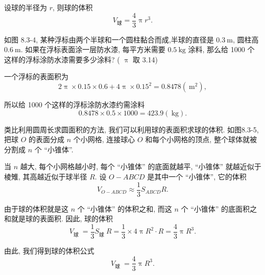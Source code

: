 \begin{formula}[球的体积]
	设球的半径为 $r$, 则球的体积
  $$
  V_{\text{球}}=\frac{4}{3} \uppi r^{3}.
  $$
\end{formula}

\begin{example}
	如图 8.3-4, 某种浮标由两个半球和一个圆柱黏合而成,半球的直径是 $0.3 \mathrm{~m}$, 圆柱高 $0.6 \mathrm{~m}$. 如果在浮标表面涂一层防水漆, 每平方米需要 $0.5 \mathrm{~kg}$ 涂料, 那么给 1000 个这样的浮标涂防水漆需要多少涂料? ( $\uppi$ 取 3.14)
\end{example}
\begin{solution}
一个浮标的表面积为
	$$
		2 \uppi \times 0.15 \times 0.6+4 \uppi \times 0.15^2=0.8478\left(\mathrm{~m}^2\right),
	$$

	所以给 1000 个这样的浮标涂防水漆约需涂料
	$$
		0.8478 \times 0.5 \times 1000=423.9(\mathrm{~kg}) .
	$$
\end{solution}


类比利用圆周长求圆面积的方法, 我们可以利用球的表面积求球的体积. 如图8.3-5,把球 $O$ 的表面分成 $n$ 个小网格, 连接球心 $O$ 和每个小网格的顶点, 整个球体就被分割成 $n$ 个 “小锥体”.

当 $n$ 越大, 每个小网格越小时, 每个 “小锥体” 的底面就越平, “小锥体” 就越近似于棱雉, 其高越近似于球半径 $R$. 设 $O-A B C D$ 是其中一个 “小锥体”, 它的体积
$$
V_{O-A B C D} \approx \frac{1}{3} S_{A B C D} R . 
$$

由于球的体积就是这 $n$ 个 “小锥体” 的体积之和, 而这 $n$ 个 “小锥体” 的底面积之和就是球的表面积. 因此, 球的体积
$$
V_{\text {球 }}=\frac{1}{3} S_{\text {球 }} R=\frac{1}{3} \times 4 \uppi R^2 \cdot R=\frac{4}{3} \uppi R^3 . 
$$

由此, 我们得到球的体积公式
$$
V_{\text {球 }}=\frac{4}{3} \uppi R^3 .
$$